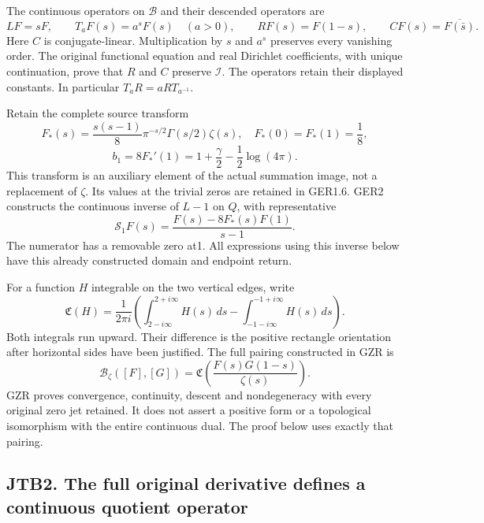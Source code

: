 The continuous operators on \(\mathcal B\) and their descended operators
are \[
LF=sF,\qquad T_aF(s)=a^sF(s)\quad(a>0),
\qquad RF(s)=F(1-s),\qquad CF(s)=\overline{F(\bar s)}.
\tag{JTB1.3}
\] Here \(C\) is conjugate-linear. Multiplication by \(s\) and \(a^s\)
preserves every vanishing order. The original functional equation and
real Dirichlet coefficients, with unique continuation, prove that \(R\)
and \(C\) preserve \(\mathcal I\). The operators retain their displayed
constants. In particular \(T_aR=aRT_{a^{-1}}\).

Retain the complete source transform \[
F_*(s)=\frac{s(s-1)}8\pi^{-s/2}\Gamma(s/2)\zeta(s),
\quad F_*(0)=F_*(1)=\frac18,
\tag{JTB1.4}
\] \[
b_1=8F_*'(1)=1+\frac\gamma2-\frac12\log(4\pi).
\tag{JTB1.5}
\] This transform is an auxiliary element of the actual summation image,
not a replacement of \(\zeta\). Its values at the trivial zeros are
retained in GER1.6. GER2 constructs the continuous inverse of \(L-1\) on
\(Q\), with representative \[
\mathscr S_1F(s)=\frac{F(s)-8F_*(s)F(1)}{s-1}.
\tag{JTB1.6}
\] The numerator has a removable zero at1. All expressions using this
inverse below have this already constructed domain and endpoint return.

For a function \(H\) integrable on the two vertical edges, write \[
\mathfrak C(H)=\frac1{2\pi i}
\left(\int_{2-i\infty}^{2+i\infty}H(s)\,ds
-\int_{-1-i\infty}^{-1+i\infty}H(s)\,ds\right).
\tag{JTB1.7}
\] Both integrals run upward. Their difference is the positive rectangle
orientation after horizontal sides have been justified. The full pairing
constructed in GZR is \[
\mathscr B_\zeta([F],[G])
=\mathfrak C\!\left(\frac{F(s)G(1-s)}{\zeta(s)}\right).
\tag{JTB1.8}
\] GZR proves convergence, continuity, descent and nondegeneracy with
every original zero jet retained. It does not assert a positive form or
a topological isomorphism with the entire continuous dual. The proof
below uses exactly that pairing.

\subsection{JTB2. The full original derivative defines a continuous
quotient
operator}\label{jtb2.-the-full-original-derivative-defines-a-continuous-quotient-operator}

